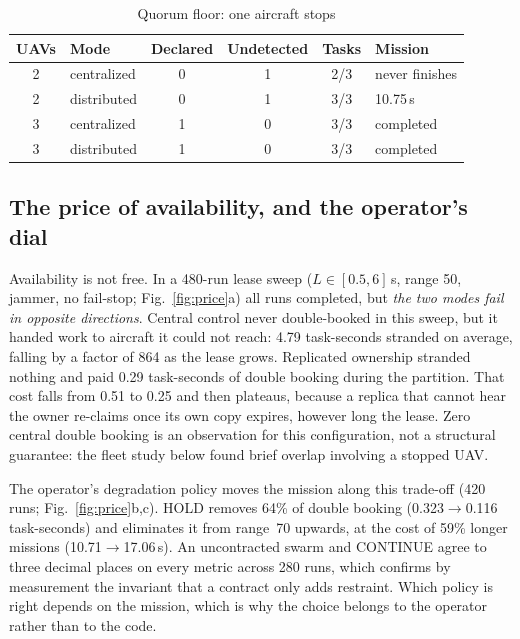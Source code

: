 \documentclass[conference]{IEEEtran}
\newcommand{\stt}[1]{\textsf{#1}}     %
\begin{document}
\begin{table}[t]
\caption{Quorum floor: one aircraft stops}
\label{tab:floor}
\centering
\footnotesize
\begin{tabular}{@{}clcccl@{}}
\toprule
UAVs & Mode & Declared & Undetected & Tasks & Mission \\
\midrule
2 & centralized & 0 & 1 & 2/3 & never finishes \\
2 & distributed & 0 & 1 & 3/3 & 10.75\,s \\
3 & centralized & 1 & 0 & 3/3 & completed \\
3 & distributed & 1 & 0 & 3/3 & completed \\
\bottomrule
\end{tabular}
\end{table}

\subsection{The price of availability, and the operator's dial}
\label{sec:price}

Availability is not free. In a 480-run lease sweep ($L\in[0.5,6]$\,s, range
50, jammer, no fail-stop; Fig.~\ref{fig:price}a) all runs completed, but
\emph{the two modes fail in opposite directions}. Central control never
double-booked in this sweep, but it handed work to aircraft it could not
reach: 4.79 task-seconds stranded on average, falling by a factor of 864 as
the lease grows. Replicated ownership stranded nothing and paid 0.29
task-seconds of double booking during the partition. That cost falls from
0.51 to 0.25 and then plateaus, because a replica that cannot hear the owner
re-claims once its own copy expires, however long the lease. Zero central
double booking is an observation for this configuration, not a structural
guarantee: the fleet study below found brief overlap involving a stopped UAV.

The operator's degradation policy moves the mission along this trade-off
(420 runs; Fig.~\ref{fig:price}b,c). \stt{HOLD} removes 64\% of double
booking (0.323$\rightarrow$0.116 task-seconds) and eliminates it from range~70
upwards, at the cost of 59\% longer missions (10.71$\rightarrow$17.06\,s). An
uncontracted swarm and \stt{CONTINUE} agree to three decimal places on every
metric across 280 runs, which confirms by measurement the invariant that a
contract only adds restraint. Which policy is right depends on the mission,
which is why the choice belongs to the operator rather than to the code.
\end{document}
